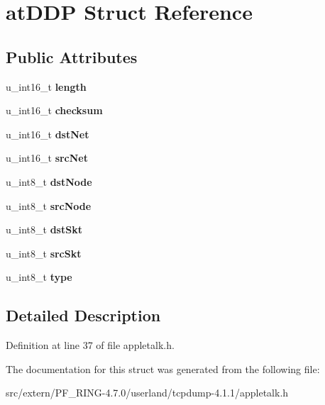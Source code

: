 \hypertarget{structat_d_d_p}{
\section{atDDP Struct Reference}
\label{structat_d_d_p}
}
\subsection*{Public Attributes}
\begin{DoxyCompactItemize}
\item 
\hypertarget{structat_d_d_p_a75580d8e58679d6e259d40180049f780}{
u\_\-int16\_\-t {\bfseries length}}
\label{structat_d_d_p_a75580d8e58679d6e259d40180049f780}

\item 
\hypertarget{structat_d_d_p_a0e88844091e473aa341bcf3a23c1a483}{
u\_\-int16\_\-t {\bfseries checksum}}
\label{structat_d_d_p_a0e88844091e473aa341bcf3a23c1a483}

\item 
\hypertarget{structat_d_d_p_aac0958b0257cd737201fa186b2623e3e}{
u\_\-int16\_\-t {\bfseries dstNet}}
\label{structat_d_d_p_aac0958b0257cd737201fa186b2623e3e}

\item 
\hypertarget{structat_d_d_p_a670a4a76b47ccc9d04ee8539bf07c239}{
u\_\-int16\_\-t {\bfseries srcNet}}
\label{structat_d_d_p_a670a4a76b47ccc9d04ee8539bf07c239}

\item 
\hypertarget{structat_d_d_p_a1a073f1f878080f1488b3656d6be760b}{
u\_\-int8\_\-t {\bfseries dstNode}}
\label{structat_d_d_p_a1a073f1f878080f1488b3656d6be760b}

\item 
\hypertarget{structat_d_d_p_a13e7e7db833448430c85909cc09e5374}{
u\_\-int8\_\-t {\bfseries srcNode}}
\label{structat_d_d_p_a13e7e7db833448430c85909cc09e5374}

\item 
\hypertarget{structat_d_d_p_a6138d3001c2d6c25852bae26be76153a}{
u\_\-int8\_\-t {\bfseries dstSkt}}
\label{structat_d_d_p_a6138d3001c2d6c25852bae26be76153a}

\item 
\hypertarget{structat_d_d_p_a274f1f299c6f771a51b274c3fdab5711}{
u\_\-int8\_\-t {\bfseries srcSkt}}
\label{structat_d_d_p_a274f1f299c6f771a51b274c3fdab5711}

\item 
\hypertarget{structat_d_d_p_ae7f956fa7c4bf5e54889101a09115a4f}{
u\_\-int8\_\-t {\bfseries type}}
\label{structat_d_d_p_ae7f956fa7c4bf5e54889101a09115a4f}

\end{DoxyCompactItemize}


\subsection{Detailed Description}


Definition at line 37 of file appletalk.h.



The documentation for this struct was generated from the following file:\begin{DoxyCompactItemize}
\item 
src/extern/PF\_\-RING-\/4.7.0/userland/tcpdump-\/4.1.1/appletalk.h\end{DoxyCompactItemize}
